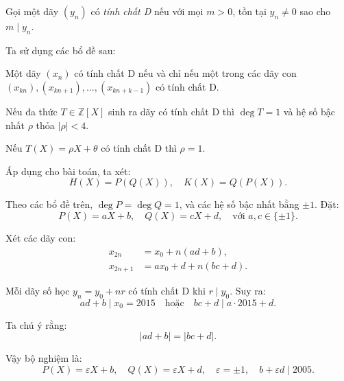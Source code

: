 \documentclass[../07-integer-polynomials.tex]{subfiles}
\begin{document}
\begin{soln}\footnotemark
	Gọi một dãy \( (y_n) \) có \textit{tính chất D} nếu với mọi \( m > 0 \), tồn tại \( y_n \ne 0 \) sao cho \( m \mid y_n \).

	Ta sử dụng các bổ đề sau:
	\begin{theorem*}[Bổ đề 1]
		Một dãy \( (x_n) \) có tính chất D nếu và chỉ nếu một trong các dãy con \( (x_{kn}), (x_{kn+1}), \dots, (x_{kn + k - 1}) \) có tính chất D.
	\end{theorem*}

	\begin{theorem*}[Bổ đề 2]
		Nếu đa thức \( T \in \mathbb{Z}[X] \) sinh ra dãy có tính chất D thì \( \deg T = 1 \) và hệ số bậc nhất \( \rho \) thỏa \( |\rho| < 4 \).
	\end{theorem*}

	\begin{theorem*}[Bổ đề 3]
		Nếu \( T(X) = \rho X + \theta \) có tính chất D thì \( \rho = 1 \).
	\end{theorem*}

	Áp dụng cho bài toán, ta xét:
	\[
		H(X) = P(Q(X)),\quad K(X) = Q(P(X)).
	\]
	
	Theo các bổ đề trên, \( \deg P = \deg Q = 1 \), và các hệ số bậc nhất bằng \( \pm 1 \). Đặt:
	\[
		P(X) = aX + b,\quad Q(X) = cX + d,\quad \text{với } a, c \in \{\pm 1\}.
	\]

	Xét các dãy con:
	\begin{align*}
		x_{2n} &= x_0 + n(ad + b), \\
		x_{2n+1} &= a x_0 + d + n(bc + d).
	\end{align*}

	Mỗi dãy số học \( y_n = y_0 + nr \) có tính chất D khi \( r \mid y_0 \). Suy ra:
	\[
		ad + b \mid x_0 = 2015 \quad \text{hoặc} \quad bc + d \mid a \cdot 2015 + d.
	\]

	Ta chú ý rằng:
	\[
		|ad + b| = |bc + d|.
	\]

	Vậy bộ nghiệm là:
	\[
		\boxed{
		P(X) = \varepsilon X + b,\quad Q(X) = \varepsilon X + d,\quad \varepsilon = \pm 1,\quad b + \varepsilon d \mid 2005.
		}
	\]
\end{soln}

\end{document}
